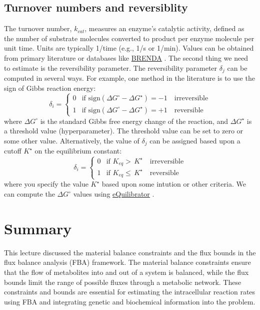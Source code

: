 \documentclass{article}[11pt]
\begin{document}
\subsection{Turnover numbers and reversiblity}
The turnover number, $k_{cat}$, measures an enzyme's catalytic activity, defined as the number of substrate molecules converted to product per enzyme molecule per unit time. Units are typically 1/time (e.g., 1/s or 1/min). 
Values can be obtained from primary literature or databases like \href{https://www.brenda-enzymes.org/}{BRENDA} \citep{BRENDA2021}.
The second thing we need to estimate is the reversibility parameter.
The reversibility parameter $\delta_{j}$ can be computed in several ways. For example, one method in the literature is to use the sign of Gibbs reaction energy:
\begin{equation*}
\delta_{i} = \begin{cases}
0 & \text{if }\text{sign}\left(\Delta{G}^{\circ} - \Delta{G}^{\star}\right)= -1 \quad\text{irreversible} \\
1 & \text{if }\text{sign}\left(\Delta{G}^{\circ} - \Delta{G}^{\star}\right)= +1 \quad\text{reversible}
\end{cases}
\end{equation*}
where $\Delta{G}^{\circ}$ is the standard Gibbs free energy change of the reaction, and $\Delta{G}^{\star}$ is a threshold value (hyperparameter). 
The threshold value can be set to zero or some other value. Alternatively, the value of $\delta_{j}$ can be assigned based upon a cutoff $K^{\star}$ on the equilibrium constant:
\begin{equation*}
\delta_{i} = \begin{cases}
0 & \text{if }K_{eq}>\,K^{\star}\quad\text{irreversible} \\
1 & \text{if }K_{eq}\leq\,K^{\star}\quad\text{reversible}
\end{cases}
\end{equation*}
where you specify the value $K^{\star}$ based upon some intution or other criteria. We can compute the $\Delta{G}^{\circ}$ values using \href{ttps://equilibrator.weizmann.ac.il}{eQuilibrator} \citep{Beber:2022aa}.

\section{Summary}
This lecture discussed the material balance constraints and the flux bounds in the flux balance analysis (FBA) framework.
The material balance constraints ensure that the flow of metabolites into and out of a system is balanced, while the flux bounds limit the range of possible fluxes through a metabolic network.
These constraints and bounds are essential for estimating the intracellular reaction rates using FBA and integrating genetic and biochemical information into the problem.


\end{document}
